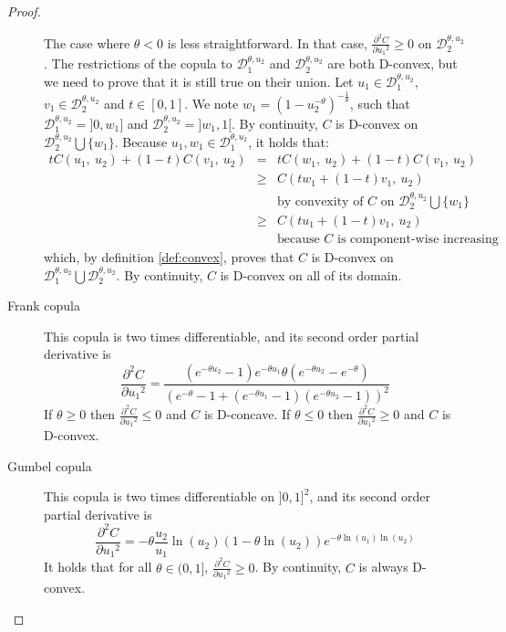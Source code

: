 \begin{proof}
\begin{description}
    The case where $\theta<0$ is less straightforward. In that case, $\frac{\partial^2 C}{\partial {u_1}^2}\geqslant0$ on $\mathcal{D}_2^{\theta,u_2}$. The restrictions of the copula to $\mathcal{D}_1^{\theta,u_2}$ and $\mathcal{D}_2^{\theta,u_2}$ are both D-convex, but we need to prove that it is still true on their union. Let $u_1\in\mathcal{D}_1^{\theta,u_2}$, $v_1\in\mathcal{D}_2^{\theta,u_2}$ and $t\in[0,1]$. We note $w_1=(1-u_2^{-\theta})^{-\frac{1}{\theta}}$, such that $\mathcal{D}_1^{\theta,u_2}=]0,w_1]$ and $\mathcal{D}_2^{\theta,u_2}=]w_1, 1[$. By continuity, $C$ is D-convex on $\mathcal{D}_2^{\theta,u_2}\bigcup\{w_1\}$. Because $u_1,w_1\in \mathcal{D}_1^{\theta,u_2}$, it holds that:
        \begin{eqnarray*}
            tC(u_1,~u_2)+(1-t)C(v_1,~u_2) &=& tC(w_1,~u_2)+(1-t)C(v_1,~u_2)\\
            &\geqslant& C(tw_1+(1-t)v_1,~u_2)\\
            &&\text{by convexity of $C$ on $\mathcal{D}_2^{\theta,u_2}\bigcup\{w_1\}$}\\
            &\geqslant& C(tu_1+(1-t)v_1,~u_2)\\
            && \text{because $C$ is component-wise increasing}
        \end{eqnarray*}
    which, by definition \ref{def:convex}, proves that $C$ is D-convex on $\mathcal{D}_1^{\theta,u_2}\bigcup \mathcal{D}_2^{\theta,u_2}$. By continuity, $C$ is D-convex on all of its domain.
    \item[Frank copula] This copula is two times differentiable, and its second order partial derivative is
    $$\frac{\partial^2 C}{\partial {u_1}^2}=\frac{(e^{-\theta u_2}-1)e^{-\theta u_1}\theta(e^{-\theta u_2}-e^{-\theta} )}{(e^{-\theta}-1+(e^{-\theta u_1}-1)(e^{-\theta u_2}-1))^2}$$
    If $\theta\geqslant0$ then $\frac{\partial^2 C}{\partial {u_1}^2}\leqslant 0$ and $C$ is D-concave. If $\theta\leqslant0$ then $\frac{\partial^2 C}{\partial {u_1}^2}\geqslant 0$ and $C$ is D-convex.
    \item[Gumbel copula] This copula is two times differentiable on $]0,1]^2$, and its second order partial derivative is
    $$\frac{\partial^2 C}{\partial {u_1}^2}=-\theta\frac{u_2}{u_1}\ln(u_2)(1-\theta\ln(u_2))e^{-\theta\ln(u_1)\ln(u_2)}$$
    It holds that for all $\theta\in(0,1]$, $\frac{\partial^2 C}{\partial {u_1}^2}\geqslant0$. By continuity, $C$ is always D-convex.
    \end{description}
\end{proof}

